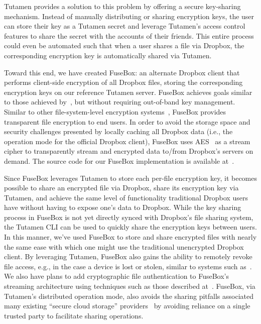 Tutamen provides a solution to this problem by offering a secure
key-sharing mechanism. Instead of manually distributing or sharing
encryption keys, the user can store their key as a Tutamen secret and
leverage Tutamen's access control features to share the secret with
the accounts of their friends. This entire process could even be
automated such that when a user shares a file via Dropbox, the
corresponding encryption key is automatically shared via Tutamen.

Toward this end, we have created FuseBox: an alternate Dropbox client
that performs client-side encryption of all Dropbox files, storing the
corresponding encryption keys on our reference Tutamen server. FuseBox
achieves goals similar to those achieved by~\cite{goh2003}, but
without requiring out-of-band key management. Similar to other
file-system-level encryption systems~\cite{blaze1993, Cattaneo2001,
  halcrow}, FuseBox provides transparent file encryption to end
users. In order to avoid the storage space and security challenges
presented by locally caching all Dropbox data (i.e., the operation mode
for the official Dropbox client), FuseBox uses AES~\cite{daemen1999,
  nist2001} as a stream cipher to transparently stream and encrypted
data to/from Dropbox's servers on demand.  The source code for our
FuseBox implementation is available at~\cite{fusebox}.

Since FuseBox leverages Tutamen to store each per-file encryption key,
it becomes possible to share an encrypted file via Dropbox, share its
encryption key via Tutamen, and achieve the same level of
functionality traditional Dropbox users have without having to expose
one's data to Dropbox. While the key sharing process in FuseBox is not
yet directly synced with Dropbox's file sharing system, the Tutamen
CLI can be used to quickly share the encryption keys between users. In
this manner, we've used FuseBox to store and share encrypted files
with nearly the same ease with which one might use the traditional
unencrypted Dropbox client. By leveraging Tutamen, FuseBox also gains
the ability to remotely revoke file access, e.g., in the case a device
is lost or stolen, similar to systems such as~\cite{geambasu2011}. We
also have plans to add cryptographic file authentication to FuseBox's
streaming architecture using techniques such as those described
at~\cite{McGrew2005}. FuseBox, via Tutamen's distributed operation
mode, also avoids the sharing pitfalls associated many existing
``secure cloud storage'' providers~\cite{wilson2014} by avoiding
reliance on a single trusted party to facilitate sharing operations.

